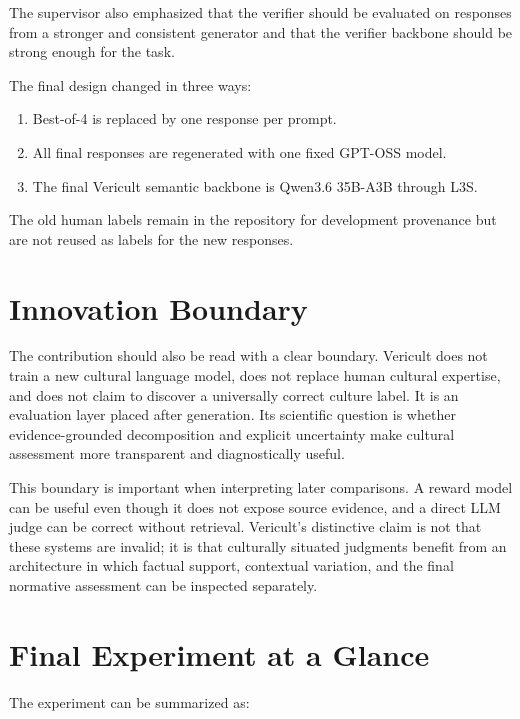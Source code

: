 The supervisor also emphasized that the verifier should be evaluated on responses from a stronger and consistent generator and that the verifier backbone should be strong enough for the task.

The final design changed in three ways:

\begin{enumerate}
\item Best-of-4 is replaced by one response per prompt.
\item All final responses are regenerated with one fixed GPT-OSS model.
\item The final Vericult semantic backbone is Qwen3.6 35B-A3B through L3S.
\end{enumerate}

The old human labels remain in the repository for development provenance but are not reused as labels for the new responses.

\section{Innovation Boundary}

The contribution should also be read with a clear boundary. Vericult does not train a new cultural language model, does not replace human cultural expertise, and does not claim to discover a universally correct culture label. It is an evaluation layer placed after generation. Its scientific question is whether evidence-grounded decomposition and explicit uncertainty make cultural assessment more transparent and diagnostically useful.

This boundary is important when interpreting later comparisons. A reward model can be useful even though it does not expose source evidence, and a direct LLM judge can be correct without retrieval. Vericult's distinctive claim is not that these systems are invalid; it is that culturally situated judgments benefit from an architecture in which factual support, contextual variation, and the final normative assessment can be inspected separately.

\section{Final Experiment at a Glance}

The experiment can be summarized as:

